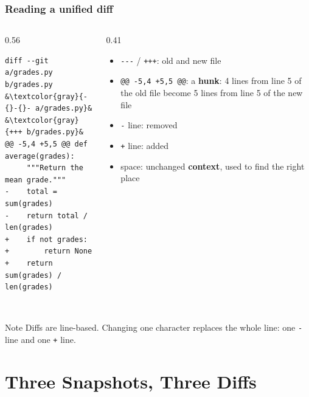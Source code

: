 \documentclass[aspectratio=169,10pt,compress]{beamer}
\begin{document}
\begin{frame}[t,fragile] \frametitle{Reading a unified diff}
  \begin{columns}[T]
    \begin{column}{0.56\textwidth}
\begin{lstlisting}[style=diff]
diff --git a/grades.py b/grades.py
&\textcolor{gray}{-{}-{}- a/grades.py}&
&\textcolor{gray}{+++ b/grades.py}&
@@ -5,4 +5,5 @@ def average(grades):
     """Return the mean grade."""
-    total = sum(grades)
-    return total / len(grades)
+    if not grades:
+        return None
+    return sum(grades) / len(grades)
 
\end{lstlisting}
    \end{column}
    \begin{column}{0.41\textwidth}
      \small
      \begin{itemize}
        \item \texttt{-{}-{}-} / \texttt{+++}: old and new file
        \item \texttt{@@ -5,4 +5,5 @@}: a \textbf{hunk}: 4 lines from line 5 of the old file
              become 5 lines from line 5 of the new file
        \item \textcolor{diffdel}{\texttt{-} line}: removed
        \item \textcolor{diffadd}{\texttt{+} line}: added
        \item space: unchanged \textbf{context}, used to find the right place
      \end{itemize}
    \end{column}
  \end{columns}

  \vspace{0.5em}
  \begin{block}{Note}
    Diffs are line-based. Changing one character replaces the whole line:
    one \texttt{-} line and one \texttt{+} line.
  \end{block}
\end{frame}

\section[3 States]{Three Snapshots, Three Diffs}
\end{document}
